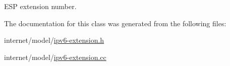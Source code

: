 E\+SP extension number. 



The documentation for this class was generated from the following files\+:\begin{DoxyCompactItemize}
\item 
internet/model/\hyperlink{ipv6-extension_8h}{ipv6-\/extension.\+h}\item 
internet/model/\hyperlink{ipv6-extension_8cc}{ipv6-\/extension.\+cc}\end{DoxyCompactItemize}
